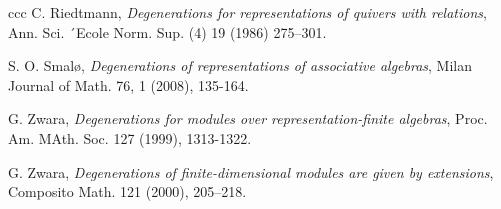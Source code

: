 \documentclass[12pt]{amsart}
\begin{document}
\begin{thebibliography}{ccc}
C. Riedtmann, \textit{Degenerations for representations of quivers with relations}, Ann. Sci. ´Ecole Norm. Sup. (4) 19 (1986) 275–301.

S. O. Smalø, \textit{Degenerations of representations of associative algebras}, Milan Journal of Math. 76, 1 (2008), 135-164.

 G. Zwara, \textit{Degenerations for modules over representation-finite algebras}, 
Proc. Am. MAth. Soc. 127 (1999), 1313-1322. 

G. Zwara, \textit{Degenerations of finite-dimensional modules are given by extensions},
Composito Math. 121 (2000), 205–218.

\end{thebibliography}

 
\end{document}
